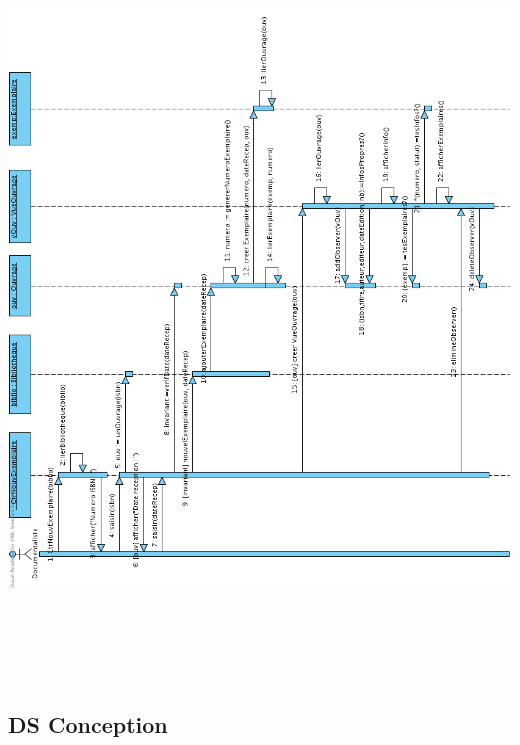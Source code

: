 \documentclass[a4paper,10pt]{report}
\begin{document}
\bigskip
\includegraphics[height=200mm]{NouvExempMVC.png}
\newpage

\subsection*{DS Conception}
\end{document}

